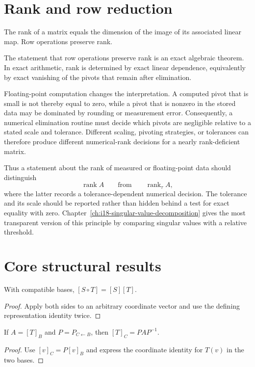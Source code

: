 \section{Rank and row reduction}
The rank of a matrix equals the dimension of the image of its associated linear map. Row operations preserve rank.

\begin{remark}
The statement that row operations preserve rank is an exact algebraic theorem.
In exact arithmetic, rank is determined by exact linear dependence, equivalently
by exact vanishing of the pivots that remain after elimination.

Floating-point computation changes the interpretation.  A computed pivot that is
small is not thereby equal to zero, while a pivot that is nonzero in the stored
data may be dominated by rounding or measurement error.  Consequently, a
numerical elimination routine must decide which pivots are negligible relative
to a stated scale and tolerance.  Different scaling, pivoting strategies, or
tolerances can therefore produce different numerical-rank decisions for a
nearly rank-deficient matrix.

Thus a statement about the rank of measured or floating-point data should
distinguish
\[
\operatorname{rank}A
\qquad\text{from}\qquad
\operatorname{rank}_{\tau}A,
\]
where the latter records a tolerance-dependent numerical decision.  The
tolerance and its scale should be reported rather than hidden behind a test for
exact equality with zero.  Chapter~\ref{ch:i18-singular-value-decomposition}
gives the most transparent version of this principle by comparing singular
values with a relative threshold.
\end{remark}

\section{Core structural results}

\begin{theorem}\label{thm:i07-01}
With compatible bases, $[S\circ T]=[S][T]$.
\begin{proof}
Apply both sides to an arbitrary coordinate vector and use the defining representation identity twice.
\end{proof}
\end{theorem}

\begin{theorem}\label{thm:i07-02}
If $A=[T]_B$ and $P=P_{C\leftarrow B}$, then $[T]_C=PAP^{-1}$.
\begin{proof}
Use $[v]_C=P[v]_B$ and express the coordinate identity for $T(v)$ in the two bases.
\end{proof}
\end{theorem}

